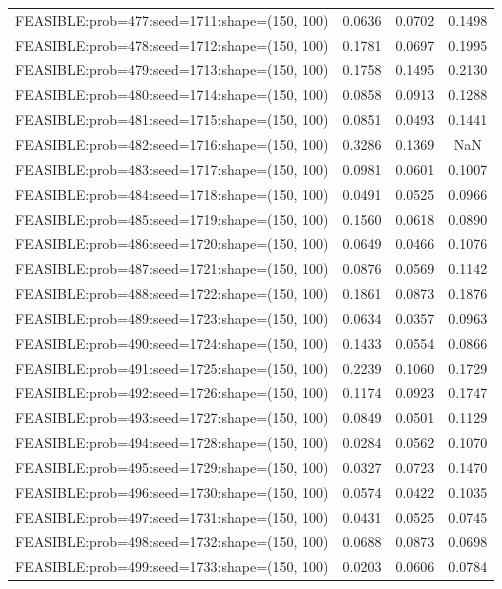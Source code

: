 \begin{longtable}{lccc}
FEASIBLE:prob=477:seed=1711:shape=(150, 100) & 0.0636 & 0.0702 & 0.1498 \\
FEASIBLE:prob=478:seed=1712:shape=(150, 100) & 0.1781 & 0.0697 & 0.1995 \\
FEASIBLE:prob=479:seed=1713:shape=(150, 100) & 0.1758 & 0.1495 & 0.2130 \\
FEASIBLE:prob=480:seed=1714:shape=(150, 100) & 0.0858 & 0.0913 & 0.1288 \\
FEASIBLE:prob=481:seed=1715:shape=(150, 100) & 0.0851 & 0.0493 & 0.1441 \\
FEASIBLE:prob=482:seed=1716:shape=(150, 100) & 0.3286 & 0.1369 &    NaN \\
FEASIBLE:prob=483:seed=1717:shape=(150, 100) & 0.0981 & 0.0601 & 0.1007 \\
FEASIBLE:prob=484:seed=1718:shape=(150, 100) & 0.0491 & 0.0525 & 0.0966 \\
FEASIBLE:prob=485:seed=1719:shape=(150, 100) & 0.1560 & 0.0618 & 0.0890 \\
FEASIBLE:prob=486:seed=1720:shape=(150, 100) & 0.0649 & 0.0466 & 0.1076 \\
FEASIBLE:prob=487:seed=1721:shape=(150, 100) & 0.0876 & 0.0569 & 0.1142 \\
FEASIBLE:prob=488:seed=1722:shape=(150, 100) & 0.1861 & 0.0873 & 0.1876 \\
FEASIBLE:prob=489:seed=1723:shape=(150, 100) & 0.0634 & 0.0357 & 0.0963 \\
FEASIBLE:prob=490:seed=1724:shape=(150, 100) & 0.1433 & 0.0554 & 0.0866 \\
FEASIBLE:prob=491:seed=1725:shape=(150, 100) & 0.2239 & 0.1060 & 0.1729 \\
FEASIBLE:prob=492:seed=1726:shape=(150, 100) & 0.1174 & 0.0923 & 0.1747 \\
FEASIBLE:prob=493:seed=1727:shape=(150, 100) & 0.0849 & 0.0501 & 0.1129 \\
FEASIBLE:prob=494:seed=1728:shape=(150, 100) & 0.0284 & 0.0562 & 0.1070 \\
FEASIBLE:prob=495:seed=1729:shape=(150, 100) & 0.0327 & 0.0723 & 0.1470 \\
FEASIBLE:prob=496:seed=1730:shape=(150, 100) & 0.0574 & 0.0422 & 0.1035 \\
FEASIBLE:prob=497:seed=1731:shape=(150, 100) & 0.0431 & 0.0525 & 0.0745 \\
FEASIBLE:prob=498:seed=1732:shape=(150, 100) & 0.0688 & 0.0873 & 0.0698 \\
FEASIBLE:prob=499:seed=1733:shape=(150, 100) & 0.0203 & 0.0606 & 0.0784 \\

\end{longtable}
